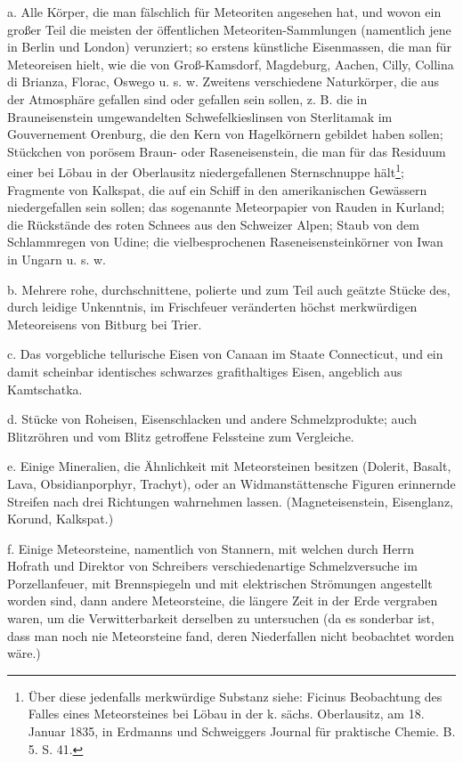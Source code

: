 \documentclass[a4paper, 11pt, oneside, polutonikogreek, german]{article}
\begin{document}
a. Alle Körper, die man fälschlich für Meteoriten angesehen hat, und wovon ein großer Teil die meisten der öffentlichen Meteoriten-Sammlungen (namentlich jene in Berlin und London) verunziert; so erstens künstliche Eisenmassen, die man für Meteoreisen hielt, wie die von Groß-Kamsdorf‚ Magdeburg, Aachen, Cilly, Collina di Brianza, Florac, Oswego u. s. w. Zweitens verschiedene Naturkörper, die aus der Atmosphäre gefallen sind oder gefallen sein sollen, z. B. die in Brauneisenstein umgewandelten Schwefelkieslinsen von Sterlitamak im Gouvernement Orenburg, die den Kern von Hagelkörnern gebildet haben sollen; Stückchen von porösem Braun- oder Raseneisenstein, die man für das Residuum einer bei Löbau in der Oberlausitz niedergefallenen Sternschnuppe hält\footnote{Über diese jedenfalls merkwürdige Substanz siehe: Ficinus Beobachtung des Falles eines Meteorsteines bei Löbau in der k. sächs. Oberlausitz, am 18. Januar 1835, in Erdmanns und Schweiggers Journal für praktische Chemie. B. 5. S. 41.}; Fragmente von Kalkspat, die auf ein Schiff in den amerikanischen Gewässern niedergefallen sein sollen; das sogenannte Meteorpapier von Rauden in Kurland; die Rückstände des roten Schnees aus den Schweizer Alpen; Staub von dem Schlammregen von Udine; die vielbesprochenen Raseneisensteinkörner von Iwan in Ungarn u. s. w.

b. Mehrere rohe, durchschnittene, polierte und zum Teil auch geätzte Stücke des, durch leidige Unkenntnis, im Frischfeuer veränderten höchst merkwürdigen Meteoreisens von Bitburg bei Trier.

c. Das vorgebliche tellurische Eisen von Canaan im Staate Connecticut, und ein damit scheinbar identisches schwarzes grafithaltiges Eisen, angeblich aus Kamtschatka.

d. Stücke von Roheisen, Eisenschlacken und andere Schmelzprodukte; auch Blitzröhren und vom Blitz getroffene Felssteine zum Vergleiche.

e. Einige Mineralien, die Ähnlichkeit mit Meteorsteinen besitzen (Dolerit, Basalt, Lava, Obsidianporphyr, Trachyt), oder an Widmanstättensche Figuren erinnernde Streifen nach drei Richtungen wahrnehmen lassen. (Magneteisenstein, Eisenglanz, Korund, Kalkspat.)

f. Einige Meteorsteine, namentlich von Stannern, mit welchen durch Herrn Hofrath und Direktor von Schreibers verschiedenartige Schmelzversuche im Porzellanfeuer, mit Brennspiegeln und mit elektrischen Strömungen angestellt worden sind, dann andere Meteorsteine, die längere Zeit in der Erde vergraben waren, um die Verwitterbarkeit derselben zu untersuchen (da es sonderbar ist, dass man noch nie Meteorsteine fand, deren Niederfallen nicht beobachtet worden wäre.)
\end{document}

